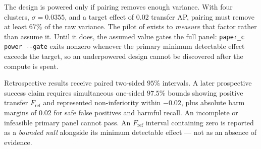 The design is powered only if pairing removes enough variance. With four
clusters, $\sigma=0.0355$, and a target effect of $0.02$ transfer AP, pairing must
remove at least $67\%$ of the raw variance. The pilot of  exists
to \emph{measure} that factor rather than assume it. Until it does, the assumed
value gates the full panel: \verb|paper_c power --gate| exits nonzero whenever the
primary minimum detectable effect exceeds the target, so an underpowered design
cannot be discovered after the compute is spent.

Retrospective results receive paired two-sided $95\%$ intervals. A later
prospective success claim requires simultaneous one-sided $97.5\%$ bounds showing
positive transfer $F_{\mathrm{ref}}$ and represented non-inferiority within
$-0.02$, plus absolute harm margins of $0.02$ for safe false positives and
harmful recall. An incomplete or infeasible primary panel cannot pass. An
$F_{\mathrm{ref}}$ interval containing zero is reported as a \emph{bounded null}
alongside its minimum detectable effect --- not as an absence of evidence.
